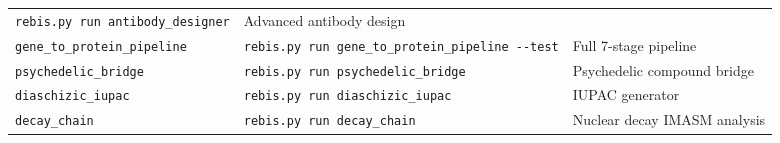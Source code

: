 \documentclass[12pt,a4paper]{article}
\begin{document}
\begin{longtable}[]{@{}lll@{}}
\begin{minipage}[t]{0.27\columnwidth}
\texttt{rebis.py\ run\ antibody\_designer}\strut
\end{minipage} & \begin{minipage}[t]{0.40\columnwidth}\raggedright
Advanced antibody design\strut
\end{minipage}\tabularnewline
\begin{minipage}[t]{0.24\columnwidth}\raggedright
\texttt{gene\_to\_protein\_pipeline}\strut
\end{minipage} & \begin{minipage}[t]{0.27\columnwidth}\raggedright
\texttt{rebis.py\ run\ gene\_to\_protein\_pipeline\ -\/-test}\strut
\end{minipage} & \begin{minipage}[t]{0.40\columnwidth}\raggedright
Full 7-stage pipeline\strut
\end{minipage}\tabularnewline
\begin{minipage}[t]{0.24\columnwidth}\raggedright
\texttt{psychedelic\_bridge}\strut
\end{minipage} & \begin{minipage}[t]{0.27\columnwidth}\raggedright
\texttt{rebis.py\ run\ psychedelic\_bridge}\strut
\end{minipage} & \begin{minipage}[t]{0.40\columnwidth}\raggedright
Psychedelic compound bridge\strut
\end{minipage}\tabularnewline
\begin{minipage}[t]{0.24\columnwidth}\raggedright
\texttt{diaschizic\_iupac}\strut
\end{minipage} & \begin{minipage}[t]{0.27\columnwidth}\raggedright
\texttt{rebis.py\ run\ diaschizic\_iupac}\strut
\end{minipage} & \begin{minipage}[t]{0.40\columnwidth}\raggedright
IUPAC generator\strut
\end{minipage}\tabularnewline
\begin{minipage}[t]{0.24\columnwidth}\raggedright
\texttt{decay\_chain}\strut
\end{minipage} & \begin{minipage}[t]{0.27\columnwidth}\raggedright
\texttt{rebis.py\ run\ decay\_chain}\strut
\end{minipage} & \begin{minipage}[t]{0.40\columnwidth}\raggedright
Nuclear decay IMASM analysis\strut
\end{minipage}\tabularnewline
\bottomrule
\end{longtable}
\end{document}
